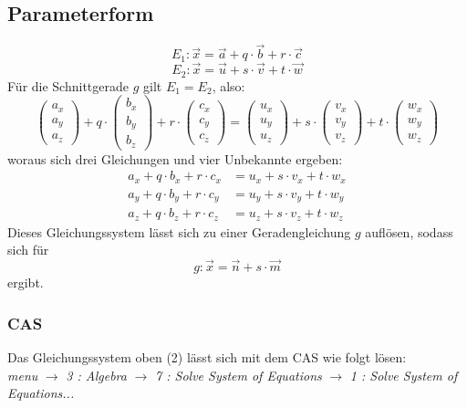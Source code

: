 \documentclass[a4paper,12pt]{article}
\begin{document}
\subsection{Parameterform}
$$E_1 : \vec{x} = \vec{a} + q \cdot \vec{b} + r \cdot \vec{c}$$
$$E_2 : \vec{x} = \vec{u} + s \cdot \vec{v} + t \cdot \vec{w}$$
Für die Schnittgerade $g$ gilt $E_1 = E_2$, also:
$$\begin{pmatrix}a_{x}\\a_{y}\\a_{z}\end{pmatrix} + q \cdot \begin{pmatrix}b_{x}\\b_{y}\\b_{z}\end{pmatrix} + r \cdot \begin{pmatrix}c_{x}\\c_{y}\\c_{z}\end{pmatrix} = \begin{pmatrix}u_{x}\\u_{y}\\u_{z}\end{pmatrix} + s \cdot \begin{pmatrix}v_{x}\\v_{y}\\v_{z}\end{pmatrix} + t \cdot \begin{pmatrix}w_{x}\\w_{y}\\w_{z}\end{pmatrix}$$
woraus sich drei Gleichungen und vier Unbekannte ergeben:
\begin{equation}
\begin{split}
a_x + q \cdot b_x + r \cdot c_x & = u_x + s \cdot v_x + t \cdot w_x\\
a_y + q \cdot b_y + r \cdot c_y & = u_y + s \cdot v_y + t \cdot w_y\\
a_z + q \cdot b_z + r \cdot c_z & = u_z + s \cdot v_z + t \cdot w_z
\end{split}
\end{equation}
Dieses Gleichungssystem lässt sich zu einer Geradengleichung $g$ auflösen, sodass sich für
$$g : \vec{x} = \vec{n} + s \cdot \vec{m}$$
ergibt.
\subsubsection{CAS}
Das Gleichungssystem oben (2) lässt sich mit dem CAS wie folgt lösen:\\
\textit{menu} $\rightarrow$ \textit{3 : Algebra} $\rightarrow$ \textit{7 : Solve System of Equations} $\rightarrow$ \textit{1 : Solve System of Equations...}
\end{document}
